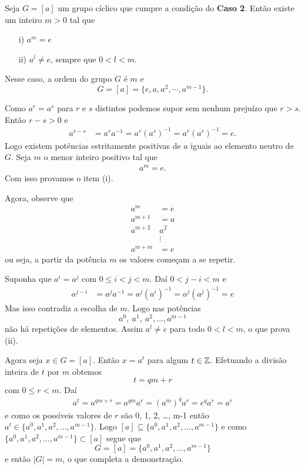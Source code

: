 \begin{proposicao}
    Seja $G = [a]$ um grupo cíclico que cumpre a condição do \textbf{Caso 2}. Então existe um inteiro $m > 0$ tal que
    \begin{enumerate}
        \item[i)] $a^m = e$

        \item[ii)] $a^l \ne e$, sempre que $0 < l < m$.
    \end{enumerate}
    Nesse caso, a ordem do grupo $G$ é $m$ e
    \[
        G = [a] = \{e, a, a^2, \cdots, a^{m - 1}\}.
    \]
\end{proposicao}
\begin{prova}
    Como $a^r = a^s$ para $r$ e $s$ distintos podemos supor sem nenhum prejuízo que $r > s$. Então $r - s > 0$ e
    \begin{align*}
        a^{r - s} &= a^ra^{-1} = a^r(a^s)^{-1} = a^r(a^r)^{-1} = e.
    \end{align*}
    Logo existem potências estritamente positivas de $a$ iguais ao elemento neutro de $G$. Seja $m$ o menor inteiro positivo tal que
    \begin{align}\label{ordem_elemento_ciclico}
        a^m = e.
    \end{align}
    Com isso provamos o item (i).

    Agora, observe que
    \begin{align*}
        a^m &= e\\
        a^{m + 1} &= a\\
        a^{m + 2} & a^2\\
        &\vdots\\
        a^{m + m} &= e
    \end{align*}
    ou seja, a partir da potência $m$ os valores começam a se repetir.

    Suponha que $a^i = a^j$ com $0 \le i < j < m$. Daí $0 < j - i < m$ e
    \begin{align*}
        a^{j -  i} &= a^ja^{-1} = a^j(a^i)^{-1} = a^j(a^j)^{-1} = e
    \end{align*}
    Mas isso contradiz a escolha de $m$. Logo nas potências
    \[
        a^0,\ a^1,\ a^2, \dots, a^{m - 1}
    \]
    não há repetições de elementos. Assim $a^l \ne e$ para todo $0 < l < m$, o que prova (ii).

    Agora seja $x \in G = [a]$. Então $x = a^t$ para algum $t \in \mathbb{Z}$. Efetuando a divisão inteira de $t$ por $m$ obtemos
    \[
        t = qm + r
    \]
    com $0 \le r < m$. Daí
    \begin{align*}
        a^t = a^{qm + r} = a^{qm}a^r = (a^m)^qa^r = e^qa^r = a^r
    \end{align*}
    e como os possíveis valores de $r$ são 0, 1, 2, \dots, m-1 então $a^t \in \{a^0, a^1, a^2, \dots, a^{m - 1}\}$. Logo $[a] \subseteq \{a^0, a^1, a^2, \dots, a^{m - 1}\}$ e como $\{a^0, a^1, a^2, \dots, a^{m - 1}\} \subset [a]$ segue que
    \[
        G = [a] = \{a^0, a^1, a^2, \dots, a^{m - 1}\}
    \]
    e então $|G| = m$, o que completa a demonstração.
\end{prova}

